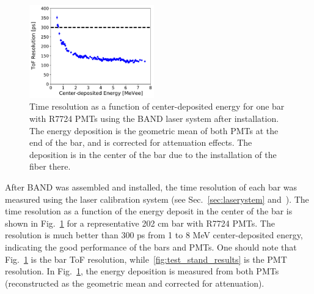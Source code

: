 \documentclass[3p,final,twocolumn]{elsarticle}
\begin{document}
\begin{figure}[tb]
	\centering
		\includegraphics[width=0.48\textwidth]{resolution-laser-scan.pdf}
		\caption{Time resolution as a function of center-deposited energy for one bar with R7724 PMTs using the
                  BAND laser system after installation. The energy deposition is the geometric mean of both PMTs at the
                  end of the bar, and is corrected for attenuation effects. The deposition is in the center of the bar due to the installation of the fiber there.}
         \label{fig:resolution-laser}
\end{figure}

After BAND was assembled and installed, the time resolution of each bar was measured using the laser calibration system (see Sec.~\ref{sec:laserystem} and~\cite{band-laser}). The time resolution as a function of the energy deposit in the center of the bar
is shown in Fig.~\ref{fig:resolution-laser} for a representative 202 \si{\centi\meter} bar 
with R7724 PMTs. The resolution is much better than 300
\si{\pico\s} from 1 to 8 \si{\mega\electronvolt} center-deposited energy, 
indicating the good performance of the bars and PMTs. One should note that 
Fig.~\ref{fig:resolution-laser} is the bar ToF resolution, while~\ref{fig:test_stand_results} is the PMT resolution. In Fig.~\ref{fig:resolution-laser}, the energy deposition is measured from both PMTs (reconstructed as the 
geometric mean and corrected for attenuation). 
\end{document}
